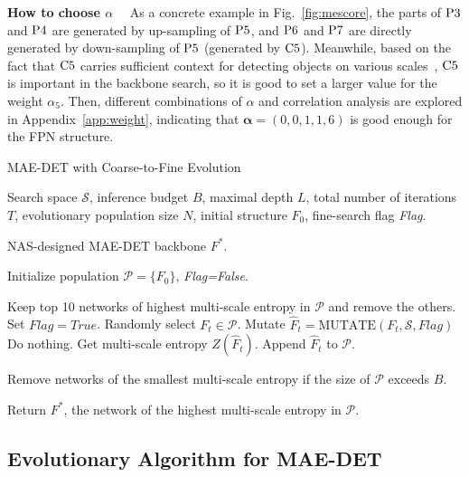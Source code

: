 \documentclass[nohyperref]{article}
\theoremstyle{plain}
\theoremstyle{definition}
\theoremstyle{remark}
\begin{document}
\noindent \textbf{How to choose ${\alpha}$}$\quad$
As a concrete example in Fig.~\ref{fig:mescore}, the parts of ${\rm P}3$ and ${\rm P}4$ are generated by up-sampling of ${\rm P}5$, and ${\rm P}6$ and ${\rm P}7$ are directly generated by down-sampling of ${\rm P}5$ (generated by ${\rm C}5$).
Meanwhile, based on the fact that ${\rm C}5$ carries sufficient context for detecting objects on various scales~\citep{yolof}, ${\rm C}5$ is important in the backbone search, so it is good to set a larger value for the weight $ \alpha_{5}$.
Then, different combinations of ${\alpha}$ and correlation analysis are explored in Appendix~\ref{app:weight}, indicating that $\boldsymbol{\alpha}=(0,0,1,1,6)$ is good enough for the FPN structure.

\begin{algorithm}
	\caption{MAE-DET with Coarse-to-Fine Evolution}
	\label{alg:MAE-DET}
	\begin{algorithmic}[1]
		
		\REQUIRE Search space $\mathcal{S}$, inference budget $B$, maximal depth $L$, total number of iterations $T$, evolutionary population size $N$, initial structure $F_0$, fine-search flag \textit{Flag}.
		
		\ENSURE NAS-designed MAE-DET backbone $F^*$.
		
		\STATE Initialize population $\mathcal{P}=\{F_0\}$, \textit{Flag=False}.
		
		\STATE Keep top 10 networks of highest multi-scale entropy in $\mathcal{P}$ and remove the others.
		\STATE Set $Flag=True$.
		\ENDIF
		\STATE Randomly select $F_t \in \mathcal{P}$.
		\STATE Mutate $\hat{F}_t=\textrm{MUTATE}(F_t, \mathcal{S}, Flag)$
		\STATE Do nothing.
		\ELSE
		\STATE Get multi-scale entropy $Z(\hat{F}_t)$.
		\STATE Append $\hat{F}_t$ to $\mathcal{P}$.
		\ENDIF
		
		\STATE Remove networks of the smallest multi-scale entropy if the size of $\mathcal{P}$ exceeds $B$.
		\ENDFOR
		
		\STATE Return $F^*$, the network of the highest multi-scale entropy in $\mathcal{P}$.
		
	\end{algorithmic}
\end{algorithm}

\subsection{Evolutionary Algorithm for MAE-DET}
\end{document}
